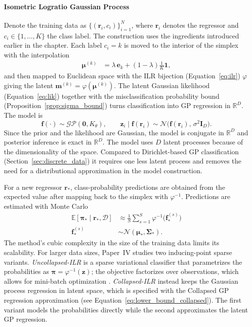 \paragraph{Isometric Logratio Gaussian Process }
Denote the training data as $\{(\boldsymbol r_i,c_i)\}_{i=1}^N$, where $\boldsymbol r_i$ denotes the regressor and $c_i\in\{1,\dots,K\}$ the class label. The construction uses the ingredients introduced earlier in the chapter. Each label $c_i=k$ is moved to the interior of the simplex with the interpolation
\begin{align*}
\boldsymbol\mu^{(k)}&=\lambda\,\boldsymbol e_k + (1-\lambda)\tfrac{1}{K}\boldsymbol 1, 
\end{align*}
and then mapped to Euclidean space with the ILR bijection (Equation~\ref{eq:ilr}) $\varphi$ giving the latent $\boldsymbol m^{(k)}=\varphi(\boldsymbol\mu^{(k)})$. The latent Gaussian likelihood (Equation~\ref{eq:lik}) together with the misclassification probability bound (Proposition~\ref{prop:sigma_bound}) turns classification into GP regression in $\mathbb{R}^D$. The model is
\begin{equation}
\boxed{
\mathbf f(\cdot) \sim \mathcal{GP}(\mathbf 0, K_{\theta}),
\qquad
\boldsymbol z_i\mid \mathbf f(\boldsymbol r_i) \sim \mathcal N\!\bigl(\mathbf f(\boldsymbol r_i),\,\sigma^2\mathbf I_D\bigr).
}
\end{equation}
Since the prior and the likelihood are Gaussian, the model is conjugate in $\mathbb{R}^D$ and posterior inference is exact in $\mathbb{R}^D$. The model uses $D$ latent processes because of the dimensionality of the space. Compared to Dirichlet-based GP classification (Section~\ref{sec:discrete_data}) it requires one less latent process and removes the need for a distributional approximation in the model construction.

For a new regressor $\boldsymbol{r}_*$, class-probability predictions are obtained from the expected value after mapping back to the simplex with $\varphi^{-1}$. Predictions are estimated with Monte Carlo
\begin{equation}
\begin{aligned}
\mathbb E[\boldsymbol\pi_*\mid \boldsymbol{r}_*,\mathcal D] &\approx
\frac{1}{S}\sum_{s=1}^S \varphi^{-1}\!\bigl(\mathbf f_*^{(s)}\bigr) \\
\mathbf f_*^{(s)}&\sim\mathcal N(\boldsymbol\mu_*,\boldsymbol\Sigma_*).
\end{aligned}
\label{eq:gpilr_pred}
\end{equation}
The method's cubic complexity in the size of the training data limits its scalability. For larger data sizes, Paper~IV studies two inducing-point sparse variants. \emph{Uncollapsed-ILR} is a sparse variational classifier that parametrizes the probabilities as $\boldsymbol{\pi} = \varphi^{-1}(\boldsymbol{z})$; the objective factorizes over observations, which allows for mini-batch optimization \citep{Hensman2015}. \emph{Collapsed-ILR} instead keeps the Gaussian process regression in latent space, which is specified with the Collapsed GP regression approximation (see Equation~\ref{eq:lower_bound_collapsed}). The first variant models the probabilities directly while the second approximates the latent GP regression.

